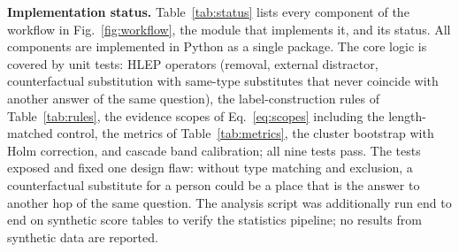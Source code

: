 \documentclass[conference]{IEEEtran}
\begin{document}
\begin{table}[t]
\caption{Configuration of implemented components.}\label{tab:config}
\centering\footnotesize
{}
\end{table}

\textbf{Implementation status.} Table~\ref{tab:status} lists every component of the workflow in Fig.~\ref{fig:workflow}, the module that implements it, and its status. All components are implemented in Python as a single package. The core logic is covered by unit tests: HLEP operators (removal, external distractor, counterfactual substitution with same-type substitutes that never coincide with another answer of the same question), the label-construction rules of Table~\ref{tab:rules}, the evidence scopes of Eq.~\eqref{eq:scopes} including the length-matched control, the metrics of Table~\ref{tab:metrics}, the cluster bootstrap with Holm correction, and cascade band calibration; all nine tests pass. The tests exposed and fixed one design flaw: without type matching and exclusion, a counterfactual substitute for a person could be a place that is the answer to another hop of the same question. The analysis script was additionally run end to end on synthetic score tables to verify the statistics pipeline; no results from synthetic data are reported.
\end{document}
